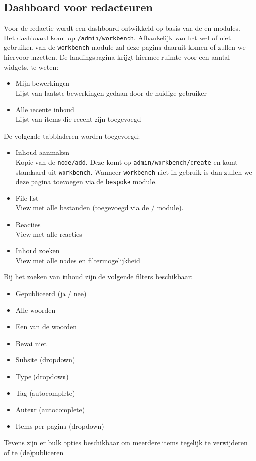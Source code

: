 \subsection{Dashboard voor redacteuren}

Voor de redactie wordt een dashboard ontwikkeld op basis van de  en  modules. Het dashboard komt op \texttt{/admin/workbench}. Afhankelijk van het wel of niet gebruiken van de \texttt{workbench} module zal deze pagina daaruit komen of zullen we hiervoor  inzetten. De landingspagina krijgt hiermee ruimte voor een aantal widgets, te weten:
\begin{itemize}
\item Mijn bewerkingen \\ Lijst van laatste bewerkingen gedaan door de huidige gebruiker
\item Alle recente inhoud \\ Lijst van items die recent zijn toegevoegd
\end{itemize}
De volgende tabbladeren worden toegevoegd:
\begin{itemize}
\item Inhoud aanmaken \\ Kopie van de \texttt{node/add}. Deze komt op \texttt{admin/workbench/create} en komt standaard uit \texttt{workbench}. Wanneer \texttt{workbench} niet in gebruik is dan zullen we deze pagina toevoegen via de \texttt{bespoke} module.
\item File list \\ View met alle bestanden (toegevoegd via de  /  module).
\item Reacties \\ View met alle reacties
\item Inhoud zoeken \\ View met alle nodes en filtermogelijkheid
\end{itemize}
Bij het zoeken van inhoud zijn de volgende filters beschikbaar:
\begin{itemize}
\item Gepubliceerd (ja / nee)
\item Alle woorden
\item Een van de woorden
\item Bevat niet
\item Subsite (dropdown)
\item Type (dropdown)
\item Tag (autocomplete)
\item Auteur (autocomplete)
\item Items per pagina (dropdown)
\end{itemize}
Tevens zijn er bulk opties beschikbaar om meerdere items tegelijk te verwijderen of te (de)publiceren.
